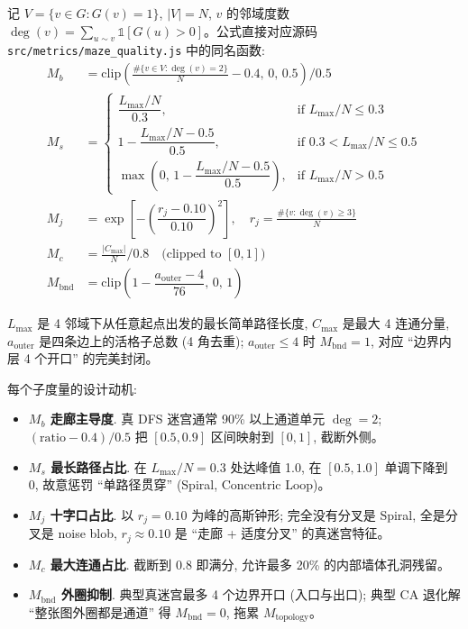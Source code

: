 记 $V = \{v \in G : G(v) = 1\}$, $|V| = N$, $v$ 的邻域度数 $\deg(v) = \sum_{u \sim v} \mathbb{1}[G(u) > 0]$。公式直接对应源码 \texttt{src/metrics/maze\_quality.js} 中的同名函数:
\begin{align}
  M_b &= \mathrm{clip}\!\left(\frac{\#\{v \in V : \deg(v) = 2\}}{N} - 0.4,\, 0,\, 0.5\right) \big/ 0.5 \label{eq:mb}\\
  M_s &= \begin{cases}
    \dfrac{L_{\max}/N}{0.3}, & \text{if } L_{\max}/N \le 0.3 \\
    1 - \dfrac{L_{\max}/N - 0.5}{0.5}, & \text{if } 0.3 < L_{\max}/N \le 0.5 \\
    \max\!\left(0,\, 1 - \dfrac{L_{\max}/N - 0.5}{0.5}\right), & \text{if } L_{\max}/N > 0.5
  \end{cases} \label{eq:ms}\\
  M_j &= \exp\!\left[-\left(\dfrac{r_j - 0.10}{0.10}\right)^{2}\right], \quad r_j = \frac{\#\{v : \deg(v) \ge 3\}}{N} \label{eq:mj}\\
  M_c &= \frac{|C_{\max}|}{N} \big/ 0.8 \quad \text{(clipped to } [0, 1] \text{)} \label{eq:mc}\\
  M_{\text{bnd}} &= \mathrm{clip}\!\left(1 - \dfrac{a_{\text{outer}} - 4}{76},\, 0,\, 1\right) \label{eq:mbnd}
\end{align}

$L_{\max}$ 是 4 邻域下从任意起点出发的最长简单路径长度, $C_{\max}$ 是最大 4 连通分量, $a_{\text{outer}}$ 是四条边上的活格子总数 (4 角去重); $a_{\text{outer}} \le 4$ 时 $M_{\text{bnd}} = 1$, 对应 ``边界内层 4 个开口'' 的完美封闭。

每个子度量的设计动机:
\begin{itemize}[leftmargin=*, itemsep=0pt, topsep=0pt]
  \item \textbf{$M_b$ 走廊主导度}. 真 DFS 迷宫通常 90\% 以上通道单元 $\deg=2$; $(\mathrm{ratio} - 0.4)/0.5$ 把 $[0.5, 0.9]$ 区间映射到 $[0, 1]$, 截断外侧。
  \item \textbf{$M_s$ 最长路径占比}. 在 $L_{\max}/N = 0.3$ 处达峰值 1.0, 在 $[0.5, 1.0]$ 单调下降到 0, 故意惩罚 ``单路径贯穿'' (Spiral, Concentric Loop)。
  \item \textbf{$M_j$ 十字口占比}. 以 $r_j = 0.10$ 为峰的高斯钟形; 完全没有分叉是 Spiral, 全是分叉是 noise blob, $r_j \approx 0.10$ 是 ``走廊 + 适度分叉'' 的真迷宫特征。
  \item \textbf{$M_c$ 最大连通占比}. 截断到 0.8 即满分, 允许最多 20\% 的内部墙体孔洞残留。
  \item \textbf{$M_{\text{bnd}}$ 外圈抑制}. 典型真迷宫最多 4 个边界开口 (入口与出口); 典型 CA 退化解 ``整张图外圈都是通道'' 得 $M_{\text{bnd}} = 0$, 拖累 $M_{\text{topology}}$。
\end{itemize}

